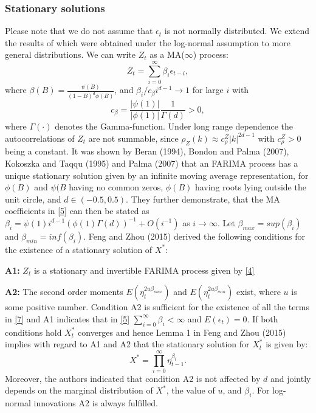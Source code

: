 \documentclass[12pt]{article}
\begin{document}
\subsubsection{Stationary solutions}
 Please note that we do not assume that $\epsilon_t$ is not normally distributed. We extend the results of \citet{beran2015modelling} which were obtained under the log-normal assumption to more general distributions.
 We can write $Z_t$ as a MA($\infty$) process:
\begin{equation}
\label{5}
Z_t=\sum_{i=0}^{\infty}\beta_i\epsilon_{t-i},
\end{equation} 
where $\beta(B)=\frac{\psi(B)}{(1-B)^d\phi(B)}$, and $\beta_i/c_{\beta} i^{d-1}\longrightarrow 1$ for large $i$ with 
\begin{equation}
	c_{\beta}=\frac{|\psi(1)|}{|\phi(1)|} \frac{1}{\Gamma(d)}>0,
\end{equation}
where $\Gamma(\cdot)$ denotes the Gamma-function. Under long range dependence the autocorrelations of $Z_t$ are not summable, since $\rho_Z(k) \approx c^Z_{\rho}|k|^{2d-1}$ with $c^Z_{\rho} > 0$ being a constant. It was shown by Beran (1994), Bondon and Palma (2007), Kokoszka and Taqqu (1995) and Palma (2007) that an FARIMA process has a unique stationary solution given by an infinite moving average representation, for $\phi(B)$ and $\psi(B$ having no common zeros, $\phi(B)$ having roots lying outside the unit circle, and $d\in(-0.5,0.5)$. They further demonstrate, that the MA coefficients in \eqref{5} can then be stated as $\beta_i=\psi(1)i^{d -1}(\phi(1)\Gamma(d))^{-1}+O(i^{-1})$ as $i\rightarrow \infty$. 
Let $\beta_{max} = sup(\beta_i)$ and $\beta_{min} = inf(\beta_i)$. Feng and Zhou (2015) derived the following conditions for the existence of a stationary solution of $X^*$:

\textbf{A1:} $Z_t$ is a stationary and invertible FARIMA process given by \eqref{4}

\textbf{A2:} The second order moments $E(\eta_t^{2u\beta_{max}})$ and $E(\eta_t^{2u\beta_{min}})$ exist, where $u$ is some positive number.
Condition A2 is sufficient for the existence of all the terms in \eqref{7} and A1 indicates that in \eqref{5} $\sum_{i=0}^{\infty}\beta_i<\infty$ and $E(\epsilon_t)=0$. If both conditions hold $X^*_t$ converges and hence 
Lemma 1 in Feng and Zhou (2015) implies with regard to A1 and A2 that the stationary solution for $X^*_t$ is given by:
\begin{equation}
\label{7}
	X^*=\prod_{i=0}^{\infty}\eta^{\beta_i}_{t-1}.
\end{equation}
Moreover, the authors indicated that condition A2 is not affected by $d$ and jointly depends on the marginal distribution of $X^*$, the value of $u$, and $\beta_i$. For log-normal innovations A2 is always fulfilled.
\end{document}
